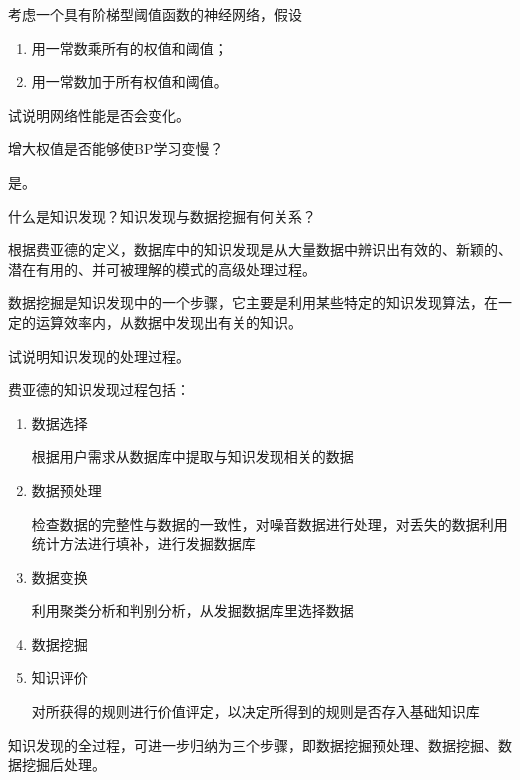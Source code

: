 \begin{question}
考虑一个具有阶梯型阈值函数的神经网络，假设
	\begin{enumerate}
		\item 用一常数乘所有的权值和阈值； 
		\item 用一常数加于所有权值和阈值。 
	\end{enumerate}
试说明网络性能是否会变化。
\end{question}
\begin{solution}
\end{solution}

\begin{question}
增大权值是否能够使BP学习变慢？
\end{question}
\begin{solution}
是。
\end{solution}

\begin{question}
什么是知识发现？知识发现与数据挖掘有何关系？ 
\end{question}
\begin{solution}
根据费亚德的定义，数据库中的知识发现是从大量数据中辨识出有效的、新颖的、潜在有用的、并可被理解的模式的高级处理过程。 \par
数据挖掘是知识发现中的一个步骤，它主要是利用某些特定的知识发现算法，在一定的运算效率内，从数据中发现出有关的知识。
\end{solution}

\begin{question}
试说明知识发现的处理过程。
\end{question}
\begin{solution}
费亚德的知识发现过程包括：
	\begin{enumerate}
		\item 数据选择 \par
		根据用户需求从数据库中提取与知识发现相关的数据 
		\item 数据预处理 \par
		检查数据的完整性与数据的一致性，对噪音数据进行处理，对丢失的数据利用统计方法进行填补，进行发掘数据库
		\item 数据变换 \par
		利用聚类分析和判别分析，从发掘数据库里选择数据
		\item 数据挖掘 
		\item 知识评价 \par
		对所获得的规则进行价值评定，以决定所得到的规则是否存入基础知识库 
	\end{enumerate}
知识发现的全过程，可进一步归纳为三个步骤，即数据挖掘预处理、数据挖掘、数据挖掘后处理。 
\end{solution}

